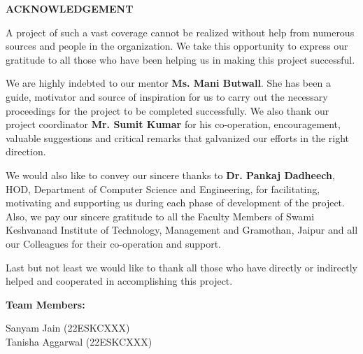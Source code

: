 \begin{center}
\LARGE{\textbf{ACKNOWLEDGEMENT}}
\end{center}

\vspace{1cm}
\linespread{1.3}
\large
A project of such a vast coverage cannot be realized without help from numerous sources and people in the organization. We take this opportunity to express our gratitude to all those who have been helping us in making this project successful.

We are highly indebted to our mentor \textbf{Ms. Mani Butwall}. She has been a guide, motivator and source of inspiration for us to carry out the necessary proceedings for the project to be completed successfully. We also thank our project coordinator \textbf{Mr. Sumit Kumar} for his co-operation, encouragement, valuable suggestions and critical remarks that galvanized our efforts in the right direction.

We would also like to convey our sincere thanks to \textbf{Dr. Pankaj Dadheech}, HOD, Department of Computer Science and Engineering, for facilitating, motivating and supporting us during each phase of development of the project. Also, we pay our sincere gratitude to all the Faculty Members of Swami Keshvanand Institute of Technology, Management and Gramothan, Jaipur and all our Colleagues for their co-operation and support.

Last but not least we would like to thank all those who have directly or indirectly helped and cooperated in accomplishing this project.

\vspace{2cm}
\noindent
\textbf{Team Members:}

\vspace{1cm}
\noindent
Sanyam Jain (22ESKCXXX) \\
Tanisha Aggarwal (22ESKCXXX)

